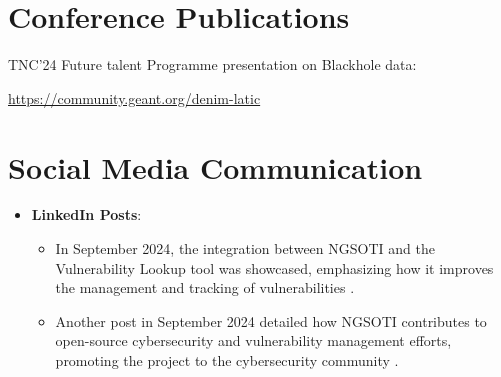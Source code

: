 \section{Conference Publications}

TNC'24 Future talent Programme presentation on Blackhole data:

  \url{https://community.geant.org/denim-latic}



\section{Social Media Communication}
\begin{itemize}
    \item \textbf{LinkedIn Posts}:
    \begin{itemize}
        \item In September 2024, the integration between NGSOTI and the Vulnerability Lookup tool was showcased, emphasizing how it improves the management and tracking of vulnerabilities \cite{kunai_integration}.
        \item Another post in September 2024 detailed how NGSOTI contributes to open-source cybersecurity and vulnerability management efforts, promoting the project to the cybersecurity community \cite{ngsoti_opensource}.
    \end{itemize}
\end{itemize}


\printbibliography
